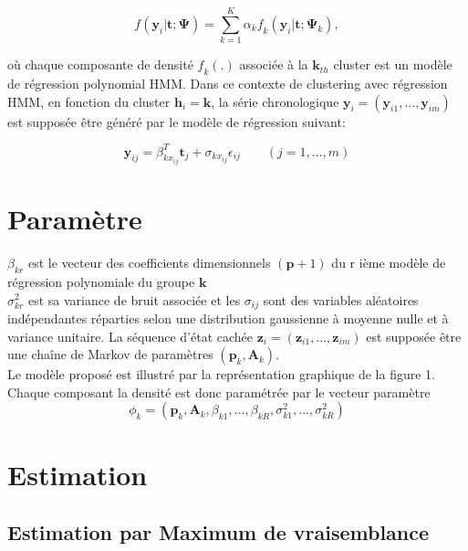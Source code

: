 \documentclass[11pt]{article}
\newcommand{\bsy}{\boldsymbol{y}}
\newcommand{\bsp}{\boldsymbol{p}}
\newcommand{\bsz}{\boldsymbol{z}}
\newcommand{\bsk}{\boldsymbol{k}}
\newcommand{\bst}{\boldsymbol{t}}
\newcommand{\bsA}{\boldsymbol{A}}
\newcommand{\bsh}{\boldsymbol{h}}
\newcommand{\cif}{\textit{f}}
\newcommand{\cim}{\textit{m}}
\newcommand{\sumK}{\sum_{k=1}^{K}}
\newcommand{\bsPsi}{\boldsymbol{\Psi}}
\begin{document}
\begin{equation}
\cif (\bsy_{i} | \bst ; \bsPsi) = \sumK \alpha_{k} \cif_{k} (\bsy_{i} | \bst ; \bsPsi_{k}),
\end{equation}

où chaque composante de densité $\cif_{k}(.)$ associée à la $\bsk_{th}$ cluster est un modèle de régression polynomial HMM. Dans ce contexte de clustering avec régression HMM, en fonction du cluster $\bsh_{i} = \bsk$, la série chronologique  $\bsy_{i} = (\bsy_{i1},\ldots, \bsy_{im})$ est supposée être généré par le modèle de régression suivant:  

\begin{equation}
\bsy_{ij}=\beta_{kx_{ij}}^{T} \bst_{j} + \sigma_{kx_{ij}}\epsilon_{ij} \qquad (j = 1,\ldots, \cim)
\end{equation}

\section{Paramètre}

$\beta_{kr}$ est le vecteur des coefficients dimensionnels $(\bsp + 1)$ du r ième modèle de régression polynomiale du groupe $\bsk$\\

$\sigma_{kr}^{2}$ est sa variance de bruit associée et les $\sigma_{ij}$ sont des variables aléatoires indépendantes réparties selon une distribution gaussienne à moyenne nulle et à variance unitaire. La séquence d'état cachée $\bsz_{i} = (\bsz_{i1},\ldots, \bsz_{im})$ est supposée être une chaîne de Markov de paramètres $(\bsp_{k}, \bsA_{k})$.\\

Le modèle proposé est illustré par la représentation graphique de la figure 1. Chaque composant la densité est donc paramétrée par le vecteur paramètre  
\begin{equation}
\phi_{k} = (\bsp_{k},\bsA_{k}, \beta_{k1},\dots, \beta_{kR}, \sigma_{k1}^{2},\dots, \sigma_{kR}^{2})
\end{equation}

\section{Estimation} 

\subsection{Estimation par Maximum de vraisemblance}
\end{document}
